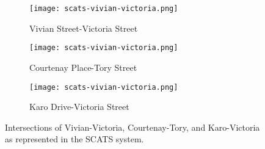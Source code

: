\begin{appendices}
\begin{figure}[H]
\centering
\begin{subfigure}{.5\textwidth}
  \centering
  \texttt{[image: scats-vivian-victoria.png]}
  \caption{Vivian Street-Victoria Street}
  \label{fig:sub1}
\end{subfigure}%
\begin{subfigure}{.5\textwidth}
  \centering
  \texttt{[image: scats-vivian-victoria.png]}
  \caption{Courtenay Place-Tory Street}
  \label{fig:sub2}
\end{subfigure}

\vspace{1cm}

\begin{subfigure}{.5\textwidth}
  \centering
  \texttt{[image: scats-vivian-victoria.png]}
  \caption{Karo Drive-Victoria Street}
  \label{fig:sub1}
\end{subfigure}%
\caption{ Intersections of Vivian-Victoria, Courtenay-Tory, and Karo-Victoria as represented in the SCATS system. }
\label{scats_intersections}
\end{figure}

\end{appendices}
